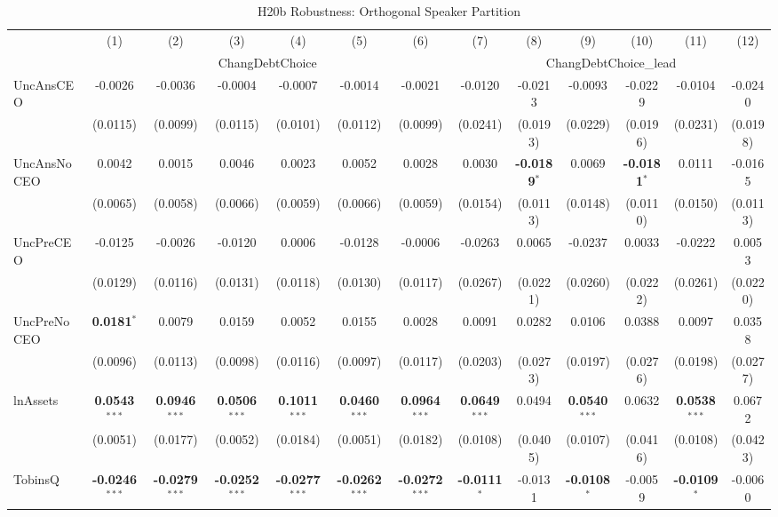 \begin{landscape}
\begin{table}[H]
\setlength{\tabcolsep}{3pt}
\renewcommand{\arraystretch}{0.85}
\centering
\caption{H20b Robustness: Orthogonal Speaker Partition}
\label{tab:h20b_robust}
\scriptsize
\begin{tabular}{lcccccccccccc}
\toprule
 & (1) & (2) & (3) & (4) & (5) & (6) & (7) & (8) & (9) & (10) & (11) & (12) \\
 & \multicolumn{6}{c}{ChangDebtChoice} & \multicolumn{6}{c}{ChangDebtChoice\_lead} \\
\cmidrule(lr){2-7} \cmidrule(lr){8-13}
\midrule
UncAnsCEO & -0.0026 & -0.0036 & -0.0004 & -0.0007 & -0.0014 & -0.0021 & -0.0120 & -0.0213 & -0.0093 & -0.0229 & -0.0104 & -0.0240 \\
 & (0.0115) & (0.0099) & (0.0115) & (0.0101) & (0.0112) & (0.0099) & (0.0241) & (0.0193) & (0.0229) & (0.0196) & (0.0231) & (0.0198) \\
UncAnsNoCEO & 0.0042 & 0.0015 & 0.0046 & 0.0023 & 0.0052 & 0.0028 & 0.0030 & \textbf{-0.0189}$^{*}$ & 0.0069 & \textbf{-0.0181}$^{*}$ & 0.0111 & -0.0165 \\
 & (0.0065) & (0.0058) & (0.0066) & (0.0059) & (0.0066) & (0.0059) & (0.0154) & (0.0113) & (0.0148) & (0.0110) & (0.0150) & (0.0113) \\
UncPreCEO & -0.0125 & -0.0026 & -0.0120 & 0.0006 & -0.0128 & -0.0006 & -0.0263 & 0.0065 & -0.0237 & 0.0033 & -0.0222 & 0.0053 \\
 & (0.0129) & (0.0116) & (0.0131) & (0.0118) & (0.0130) & (0.0117) & (0.0267) & (0.0221) & (0.0260) & (0.0222) & (0.0261) & (0.0220) \\
UncPreNoCEO & \textbf{0.0181}$^{*}$ & 0.0079 & 0.0159 & 0.0052 & 0.0155 & 0.0028 & 0.0091 & 0.0282 & 0.0106 & 0.0388 & 0.0097 & 0.0358 \\
 & (0.0096) & (0.0113) & (0.0098) & (0.0116) & (0.0097) & (0.0117) & (0.0203) & (0.0273) & (0.0197) & (0.0276) & (0.0198) & (0.0277) \\
\midrule
lnAssets & \textbf{0.0543}$^{***}$ & \textbf{0.0946}$^{***}$ & \textbf{0.0506}$^{***}$ & \textbf{0.1011}$^{***}$ & \textbf{0.0460}$^{***}$ & \textbf{0.0964}$^{***}$ & \textbf{0.0649}$^{***}$ & 0.0494 & \textbf{0.0540}$^{***}$ & 0.0632 & \textbf{0.0538}$^{***}$ & 0.0672 \\
 & (0.0051) & (0.0177) & (0.0052) & (0.0184) & (0.0051) & (0.0182) & (0.0108) & (0.0405) & (0.0107) & (0.0416) & (0.0108) & (0.0423) \\
TobinsQ & \textbf{-0.0246}$^{***}$ & \textbf{-0.0279}$^{***}$ & \textbf{-0.0252}$^{***}$ & \textbf{-0.0277}$^{***}$ & \textbf{-0.0262}$^{***}$ & \textbf{-0.0272}$^{***}$ & \textbf{-0.0111}$^{*}$ & -0.0131 & \textbf{-0.0108}$^{*}$ & -0.0059 & \textbf{-0.0109}$^{*}$ & -0.0060 \\

\end{tabular}
\end{table}
\end{landscape}
